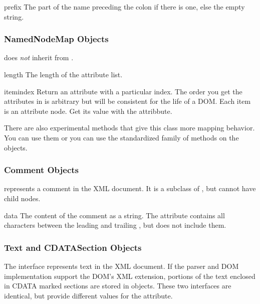 \begin{memberdesc}[Attr]{prefix}
The part of the name preceding the colon if there is one, else the
empty string.
\end{memberdesc}


\subsubsection{NamedNodeMap Objects \label{dom-attributelist-objects}}

 does \emph{not} inherit from .

\begin{memberdesc}[NamedNodeMap]{length}
The length of the attribute list.
\end{memberdesc}

\begin{methoddesc}[NamedNodeMap]{item}{index}
Return an attribute with a particular index.  The order you get the
attributes in is arbitrary but will be consistent for the life of a
DOM.  Each item is an attribute node.  Get its value with the
 attribbute.
\end{methoddesc}

There are also experimental methods that give this class more mapping
behavior.  You can use them or you can use the standardized
 family of methods on the 
objects.


\subsubsection{Comment Objects \label{dom-comment-objects}}

 represents a comment in the XML document.  It is a
subclass of , but cannot have child nodes.

\begin{memberdesc}[Comment]{data}
The content of the comment as a string.  The attribute contains all
characters between the leading \code{<!-}\code{-} and trailing
\code{-}\code{->}, but does not include them.
\end{memberdesc}


\subsubsection{Text and CDATASection Objects \label{dom-text-objects}}

The  interface represents text in the XML document.  If
the parser and DOM implementation support the DOM's XML extension,
portions of the text enclosed in CDATA marked sections are stored in
 objects.  These two interfaces are identical, but
provide different values for the  attribute.

